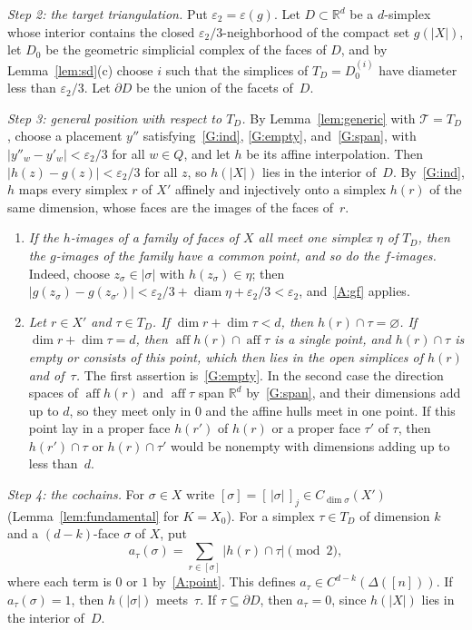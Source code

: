 \documentclass[11pt]{article}
\theoremstyle{definition}
\numberwithin{equation}{section}
\newcommand{\R}{\mathbb R}
\DeclareMathOperator{\aff}{aff}
\begin{document}
\emph{Step 2: the target triangulation.} Put $\varepsilon_2=\varepsilon(g)$. Let $D\subset\R^d$ be a $d$-simplex whose interior contains the closed $\varepsilon_2/3$-neighborhood of the compact set $g(|X|)$, let $D_0$ be the geometric simplicial complex of the faces of $D$, and by Lemma~\ref{lem:sd}(c) choose $i$ such that the simplices of $T_D=D_0^{(i)}$ have diameter less than $\varepsilon_2/3$. Let $\partial D$ be the union of the facets of~$D$.

\emph{Step 3: general position with respect to $T_D$.} By Lemma~\ref{lem:generic} with $\mathcal T=T_D$, choose a placement $y''$ satisfying~\ref{G:ind}, \ref{G:empty}, and~\ref{G:span}, with $|y''_w-y'_w|<\varepsilon_2/3$ for all $w\in Q$, and let $h$ be its affine interpolation. Then $|h(z)-g(z)|<\varepsilon_2/3$ for all $z$, so $h(|X|)$ lies in the interior of~$D$. By~\ref{G:ind}, $h$ maps every simplex $r$ of $X'$ affinely and injectively onto a simplex $h(r)$ of the same dimension, whose faces are the images of the faces of~$r$.
\begin{enumerate}[label=\textup{(A\arabic*)},resume]
\item\label{A:hg} \emph{If the $h$-images of a family of faces of $X$ all meet one simplex $\eta$ of $T_D$, then the $g$-images of the family have a common point, and so do the $f$-images.} Indeed, choose $z_\sigma\in|\sigma|$ with $h(z_\sigma)\in\eta$; then $|g(z_\sigma)-g(z_{\sigma'})|<\varepsilon_2/3+\operatorname{diam}\eta+\varepsilon_2/3<\varepsilon_2$, and~\ref{A:gf} applies.
\item\label{A:point} \emph{Let $r\in X'$ and $\tau\in T_D$. If $\dim r+\dim\tau<d$, then $h(r)\cap\tau=\varnothing$. If $\dim r+\dim\tau=d$, then $\aff h(r)\cap\aff\tau$ is a single point, and $h(r)\cap\tau$ is empty or consists of this point, which then lies in the open simplices of $h(r)$ and of~$\tau$.} The first assertion is~\ref{G:empty}. In the second case the direction spaces of $\aff h(r)$ and $\aff\tau$ span $\R^d$ by~\ref{G:span}, and their dimensions add up to $d$, so they meet only in $0$ and the affine hulls meet in one point. If this point lay in a proper face $h(r')$ of $h(r)$ or a proper face $\tau'$ of $\tau$, then $h(r')\cap\tau$ or $h(r)\cap\tau'$ would be nonempty with dimensions adding up to less than~$d$.
\end{enumerate}

\emph{Step 4: the cochains.} For $\sigma\in X$ write $[\sigma]=[\,|\sigma|\,]_j\in C_{\dim\sigma}(X')$ (Lemma~\ref{lem:fundamental} for $K=X_0$). For a simplex $\tau\in T_D$ of dimension $k$ and a $(d-k)$-face $\sigma$ of $X$, put
\begin{equation*}
 a_\tau(\sigma)=\sum_{r\in[\sigma]}|h(r)\cap\tau|\pmod 2,
\end{equation*}
where each term is $0$ or $1$ by~\ref{A:point}. This defines $a_\tau\in C^{d-k}(\Delta([n]))$. If $a_\tau(\sigma)=1$, then $h(|\sigma|)$ meets~$\tau$. If $\tau\subseteq\partial D$, then $a_\tau=0$, since $h(|X|)$ lies in the interior of~$D$.
\end{document}
